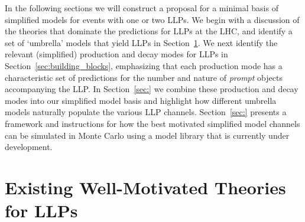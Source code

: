 In the following sections we will construct a proposal for a minimal basis of simplified models for events with one or two LLPs.
We begin with a discussion of the theories that dominate the predictions for LLPs at the LHC, and identify a set of `umbrella' models that yield LLPs in Section~\ref{sec:motivated_theories}.  We next identify the relevant (simplified) production and decay modes for LLPs in Section~\ref{sec:building_blocks},  emphasizing that each production mode has a characteristic set of predictions for the number and nature of {\em prompt} objects accompanying the LLP.  In Section~\ref{sec:} we combine these production and decay modes into our simplified model basis and highlight how different umbrella models naturally populate the various LLP channels.  Section~\ref{sec:}  presents a framework and instructions for how the best motivated simplified model channels can be simulated in Monte Carlo using a model library that is currently under development. 


\section{Existing Well-Motivated Theories for LLPs}\label{sec:motivated_theories}

